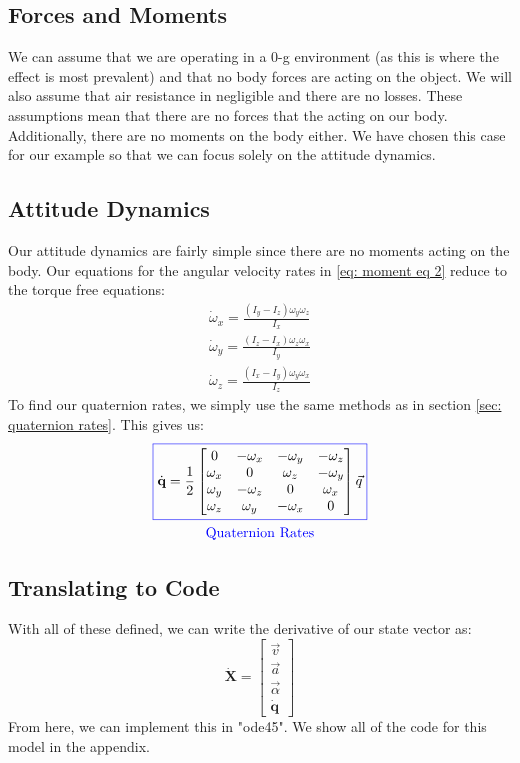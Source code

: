 \documentclass[12pt]{report}
\begin{document}
{\subsection{Forces and Moments}
We can assume that we are operating in a 0-g environment (as this is where the effect is most prevalent) and that no body forces are acting on the object. We will also assume that air resistance in negligible and there are no losses. These assumptions mean that there are no forces that the acting on our body. Additionally, there are no moments on the body either. We have chosen this case for our example so that we can focus solely on the attitude dynamics.
\subsection{Attitude Dynamics}
Our attitude dynamics are fairly simple since there are no moments acting on the body. Our equations for the angular velocity rates in \eqref{eq: moment eq 2} reduce to the torque free equations:
\begin{gather}\label{eq: moment eq dzhan}
    \dot{\omega}_x=\frac{\left(I_y-I_z\right)\omega_y\omega_z}{I_x}\\
    \dot{\omega}_y=\frac{\left(I_z-I_x\right)\omega_z\omega_x}{I_y}\\
    \dot{\omega}_z=\frac{\left(I_x-I_y\right)\omega_y\omega_x}{I_z}
\end{gather}
To find our \gls{quaternion} rates, we simply use the same methods as in section \ref{sec: quaternion rates}. This gives us:
\begin{gather}
    \color{blue}\boxed{\color{black}\dot{\textbf{q}}=\frac{1}{2}\begin{bmatrix}
        0&-\omega_x&-\omega_y&-\omega_z\\
        \omega_x&0&\omega_z&-\omega_y\\
        \omega_y&-\omega_z&0&\omega_x\\
        \omega_z&\omega_y&-\omega_x&0
    \end{bmatrix}\vec{q}}
    \\\mathrm{\color{blue}Quaternion \ Rates}
\end{gather}
\subsection{Translating to Code}
With all of these defined, we can write the derivative of our \gls{state vector} as:
\begin{equation}
    \dot{\textbf{X}}=\begin{bmatrix}
        \vec{v}\\\vec{a}\\\vec{\alpha}\\\dot{\textbf{q}}
    \end{bmatrix}
\end{equation}
From here, we can implement this in "ode45". We show all of the code for this model in the appendix.

}
\end{document}

